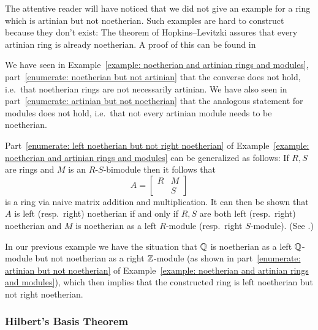 \begin{remark}
  The attentive reader will have noticed that we did not give an example for a ring which is artinian but not noetherian.
  Such examples are hard to construct because they don’t exist:
  The theorem of Hopkins--Levitzki assures that every artinian ring is already noetherian.
  A proof of this can be found in \cite[Theorem~4.15]{Lam1991First}
  
  We have seen in Example~\ref{example: noetherian and artinian rings and modules}, part~\ref*{enumerate: noetherian but not artinian} that the converse does not hold, i.e.\ that noetherian rings are not necessarily artinian.
  We have also seen in part~\ref*{enumerate: artinian but not noetherian} that the analogous statement for modules does not hold, i.e.\ that not every artinian module needs to be noetherian.
\end{remark}


\begin{remark}
  Part~\ref*{enumerate: left noetherian but not right noetherian} of Example~\ref{example: noetherian and artinian rings and modules} can be generalized as follows:
  If $R, S$ are rings and $M$ is an $R$-$S$-bimodule then it follows that
  \[
      A
    = \begin{bmatrix}
        R & M \\
          & S
      \end{bmatrix}
  \]
  is a ring via naive matrix addition and multiplication.
  It can then be shown that $A$ is left (resp.\ right) noetherian if and only if $R, S$ are both left (resp.\ right) noetherian and $M$ is noetherian as a left $R$-module (resp.\ right $S$-module).
  (See \cite[Theorem~1.22]{Lam1991First}.)
  
  In our previous example we have the situation that $\mathbb{Q}$ is noetherian as a left $\mathbb{Q}$-module but not noetherian as a right $\mathbb{Z}$-module (as shown in part~\ref*{enumerate: artinian but not noetherian} of Example~\ref{example: noetherian and artinian rings and modules}), which then implies that the constructed ring is left noetherian but not right noetherian.
\end{remark}






\subsubsection{Hilbert’s Basis Theorem}


